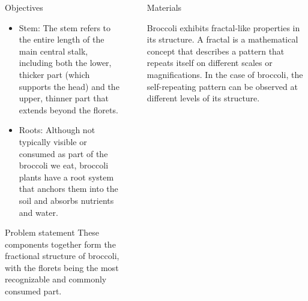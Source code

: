 \documentclass[]{beamer}
\begin{document}
\begin{frame}[t]
\begin{columns}[t]
\begin{column}{\onecolwid}
\begin{alertblock}{Objectives}
\begin{itemize}
    	\item Stem: The stem refers to the entire length of the main central stalk, including both the lower, thicker part (which supports the head) and the upper, thinner part that extends beyond the florets.

    	\item Roots: Although not typically visible or consumed as part of the broccoli we eat, broccoli plants have a root system that anchors them into the soil and absorbs nutrients and water.
    \end{itemize}
    
    \end{alertblock}
    
    \begin{block}{Problem statement}
    These components together form the fractional structure of broccoli, with the florets being the most recognizable and commonly consumed part.
    \end{block}
    
    
    \end{column} %
    
    \begin{column}{\sepwid}\end{column} %
    
    \begin{column}{\twocolwid} %
    
    \begin{columns}[t,totalwidth=\twocolwid] %
    
    \begin{column}{\onecolwid}\vspace{-.6in} %
    
    
    \begin{block}{Materials}
    
     Broccoli exhibits fractal-like properties in its structure. A fractal is a mathematical concept that describes a pattern that repeats itself on different scales or magnifications. In the case of broccoli, the self-repeating pattern can be observed at different levels of its structure.
     

\end{block}
\end{column}
\end{columns}
\end{column}
\end{columns}
\end{frame}
\end{document}
